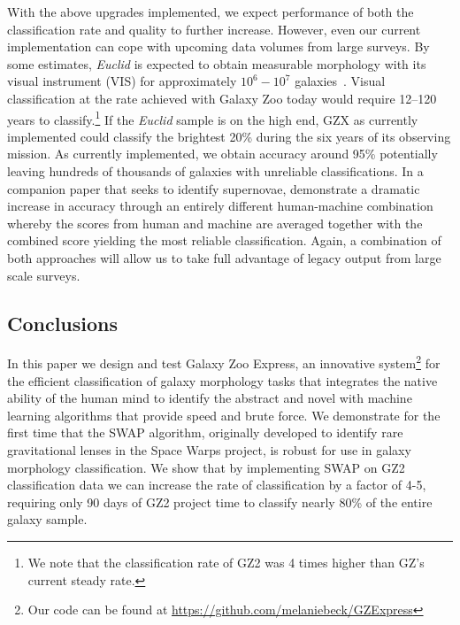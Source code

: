 \documentclass[twocolumn,  trackchanges, ]{aastex6}%
\begin{document}
With the above upgrades implemented, we expect performance of both the
classification rate and quality to further increase. However, even our current 
implementation can cope with upcoming data volumes from large surveys. 
By some estimates, \textit{Euclid} is expected to obtain measurable morphology with its 
visual instrument (VIS) for approximately $10^6 - 10^7$ galaxies~\citep{Euclid}.
Visual classification at the rate achieved with Galaxy Zoo today
would require 12--120 years to classify.\footnote{We note that the classification 
rate of GZ2 was 4 times higher than GZ's current steady rate.}
If the \textit{Euclid} sample is on the high end, GZX as currently implemented
could classify the brightest 20\% during the six years of its observing mission. 
As currently implemented, we obtain accuracy around 95\% potentially leaving
hundreds of thousands of galaxies with unreliable classifications.  
In a companion paper that seeks to identify supernovae, \cite{Wright2017} 
demonstrate a dramatic increase in accuracy through an entirely different human-machine 
combination whereby the
scores from human and machine are averaged together with the combined score 
yielding the most reliable classification. Again, a combination of both 
approaches will allow us to take full advantage of legacy output from large scale surveys.


\subsection{Conclusions}

In this paper we design and test Galaxy Zoo Express, an innovative system\footnote{Our code can be found at \url{https://github.com/melaniebeck/GZExpress}} 
for the efficient classification of galaxy morphology tasks that integrates the 
native ability of the human mind to identify the abstract and novel with 
machine learning algorithms that provide speed and brute force.  
We demonstrate for the first time that the 
SWAP algorithm, originally developed to identify rare gravitational lenses in the 
Space Warps project, is robust for use in galaxy morphology classification. 
We show that by implementing
SWAP on GZ2 classification data we can increase the rate of classification by a factor
of 4-5, requiring only 90 days of GZ2 project time to classify nearly 80\% of the entire galaxy sample. 
\end{document}
